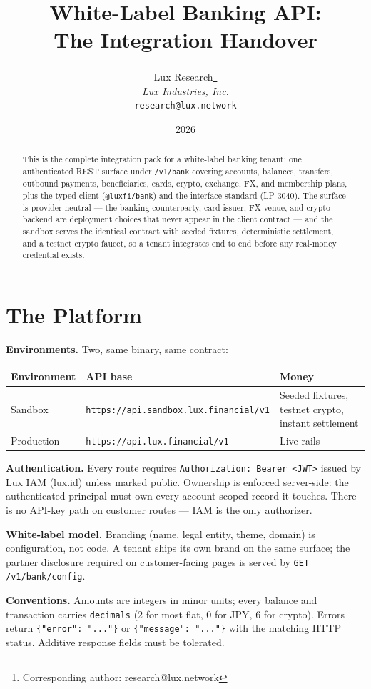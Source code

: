 \documentclass[11pt]{article}
\title{White-Label Banking API:\\The Integration Handover}
\author{
Lux Research\thanks{Corresponding author: research@lux.network}\\
\textit{Lux Industries, Inc.}\\
\texttt{research@lux.network}
}
\date{2026}
\newcommand{\ep}[1]{\texttt{\small #1}}
\begin{document}
\luxcoverpage

\begin{abstract}
This is the complete integration pack for a white-label banking tenant: one authenticated REST surface under \ep{/v1/bank} covering accounts, balances, transfers, outbound payments, beneficiaries, cards, crypto, exchange, FX, and membership plans, plus the typed client (\ep{@luxfi/bank}) and the interface standard (LP-3040). The surface is provider-neutral --- the banking counterparty, card issuer, FX venue, and crypto backend are deployment choices that never appear in the client contract --- and the sandbox serves the identical contract with seeded fixtures, deterministic settlement, and a testnet crypto faucet, so a tenant integrates end to end before any real-money credential exists.
\end{abstract}

\section{The Platform}

\textbf{Environments.} Two, same binary, same contract:

\begin{table}[H]
\centering
\small
\begin{tabular}{@{}lll@{}}
\toprule
\textbf{Environment} & \textbf{API base} & \textbf{Money} \\
\midrule
Sandbox & \ep{https://api.sandbox.lux.financial/v1} & Seeded fixtures, testnet crypto, instant settlement \\
Production & \ep{https://api.lux.financial/v1} & Live rails \\
\bottomrule
\end{tabular}
\end{table}

\textbf{Authentication.} Every route requires
\ep{Authorization: Bearer <JWT>} issued by Lux IAM (lux.id) unless
marked public. Ownership is enforced server-side: the authenticated
principal must own every account-scoped record it touches. There is
no API-key path on customer routes --- IAM is the only authorizer.

\textbf{White-label model.} Branding (name, legal entity, theme,
domain) is configuration, not code. A tenant ships its own brand on
the same surface; the partner disclosure required on customer-facing
pages is served by \ep{GET /v1/bank/config}.

\textbf{Conventions.} Amounts are integers in minor units; every
balance and transaction carries \ep{decimals} (2 for most fiat, 0
for JPY, 6 for crypto). Errors return
\ep{\{"error": "..."\}} or \ep{\{"message": "..."\}} with the
matching HTTP status. Additive response fields must be tolerated.
\end{document}
